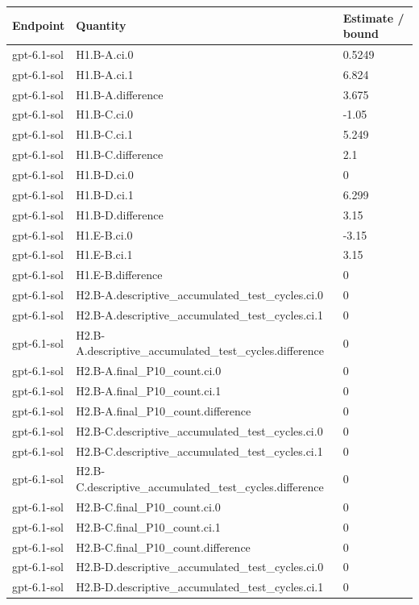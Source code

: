 \begin{tabular}{lll}
Endpoint & Quantity & Estimate / bound \\ \hline
gpt-6.1-sol & H1.B-A.ci.0 & 0.5249 \\
gpt-6.1-sol & H1.B-A.ci.1 & 6.824 \\
gpt-6.1-sol & H1.B-A.difference & 3.675 \\
gpt-6.1-sol & H1.B-C.ci.0 & -1.05 \\
gpt-6.1-sol & H1.B-C.ci.1 & 5.249 \\
gpt-6.1-sol & H1.B-C.difference & 2.1 \\
gpt-6.1-sol & H1.B-D.ci.0 & 0 \\
gpt-6.1-sol & H1.B-D.ci.1 & 6.299 \\
gpt-6.1-sol & H1.B-D.difference & 3.15 \\
gpt-6.1-sol & H1.E-B.ci.0 & -3.15 \\
gpt-6.1-sol & H1.E-B.ci.1 & 3.15 \\
gpt-6.1-sol & H1.E-B.difference & 0 \\
gpt-6.1-sol & H2.B-A.descriptive\_accumulated\_test\_cycles.ci.0 & 0 \\
gpt-6.1-sol & H2.B-A.descriptive\_accumulated\_test\_cycles.ci.1 & 0 \\
gpt-6.1-sol & H2.B-A.descriptive\_accumulated\_test\_cycles.difference & 0 \\
gpt-6.1-sol & H2.B-A.final\_P10\_count.ci.0 & 0 \\
gpt-6.1-sol & H2.B-A.final\_P10\_count.ci.1 & 0 \\
gpt-6.1-sol & H2.B-A.final\_P10\_count.difference & 0 \\
gpt-6.1-sol & H2.B-C.descriptive\_accumulated\_test\_cycles.ci.0 & 0 \\
gpt-6.1-sol & H2.B-C.descriptive\_accumulated\_test\_cycles.ci.1 & 0 \\
gpt-6.1-sol & H2.B-C.descriptive\_accumulated\_test\_cycles.difference & 0 \\
gpt-6.1-sol & H2.B-C.final\_P10\_count.ci.0 & 0 \\
gpt-6.1-sol & H2.B-C.final\_P10\_count.ci.1 & 0 \\
gpt-6.1-sol & H2.B-C.final\_P10\_count.difference & 0 \\
gpt-6.1-sol & H2.B-D.descriptive\_accumulated\_test\_cycles.ci.0 & 0 \\
gpt-6.1-sol & H2.B-D.descriptive\_accumulated\_test\_cycles.ci.1 & 0 \\

\end{tabular}

